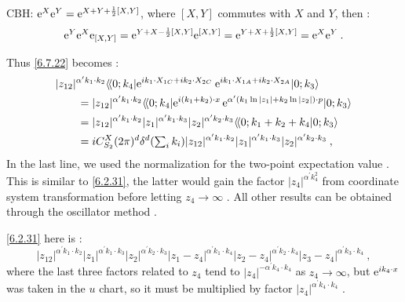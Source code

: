 \begin{tcolorbox}
	\begin{remark}
		CBH: $\mathrm{e}^X \mathrm{e}^Y=\mathrm{e}^{X+Y+\frac{1}{2}[X, Y]}$, where $[X, Y]$ commutes with $X$ and $Y$, then :
		\[
		\mathrm{e}^Y \mathrm{e}^X \mathrm{e}_{[X,Y]}= \mathrm{e}^{Y+X-\frac{1}{2}[X, Y]} \mathrm{e}^{[X,Y]} = \mathrm{e}^{Y+X+\frac{1}{2}[X, Y]} = \mathrm{e}^X \mathrm{e}^Y \:.
		\]
	\end{remark}
\end{tcolorbox}
\noindent Thus \eqref{6.7.22} becomes :
\begin{align}
	&|z_{12}|^{\alpha^{\prime} k_{1} \cdot k_{2}} \langle\!\langle 0 ; k_{4}|\mathrm{e}^{i k_{1} \cdot X_{1 C}+i k_{2} \cdot X_{2 C}} \: \mathrm{e}^{i k_{1} \cdot X_{1 A}+ i k_{2} \cdot X_{2 A}} | 0 ; k_{3}\rangle \nonumber \\
	&\qquad =|z_{12}|^{\alpha^{\prime} k_{1} \cdot k_{2}} \langle\!\langle 0 ; k_{4}|\mathrm{e}^{i(k_{1}+k_{2}) \cdot x} \, \mathrm{e}^{\alpha^{\prime}(k_{1} \ln |z_{1}|+k_{2} \ln |z_{2}|) \cdot p}| 0 ; k_{3}\rangle \nonumber \\
	&\qquad  = |z_{12}|^{\alpha^{\prime} k_{1} \cdot k_{2}} |z_{1}|^{\alpha^{\prime} k_{1} \cdot k_{3}} |z_{2}|^{\alpha^{\prime} k_{2} \cdot k_{3}} \langle\!\langle0 ; k_{1}+k_{2}+k_{4} |0 ; k_{3} \rangle \nonumber \\
	&\qquad =i C_{S_{2}}^{X}(2 \pi)^{d} \delta^{d}({\textstyle\sum_{i} k_{i}}) |z_{12}|^{\alpha^{\prime} k_{1} \cdot k_{2}} |z_{1}|^{\alpha^{\prime} k_{1} \cdot k_{3}} |z_{2}|^{\alpha^{\prime} k_{2} \cdot k_{3}} \:, \label{6.7.24}
\end{align}
In the last line, we used the normalization for the two-point expectation value . This is similar to \eqref{6.2.31}, the latter would gain the factor $|z_{4}|^{\alpha^{\prime} k_{4}^{2}}$ from coordinate system transformation before letting $z_{4} \rightarrow \infty$ . All other results can be obtained through the oscillator method .

\begin{tcolorbox}
	\begin{remark}
		\eqref{6.2.31} here is :
		\[
		|z_{12}|^{\alpha^{\prime} k_{1}\cdot k_{2}} |z_{1}|^{\alpha^{\prime} k_{1} \cdot k_{3}} 
		|z_{2}|^{\alpha^{\prime} k_{2} \cdot k_{3}}	|z_{1}-z_{4}|^{\alpha^{\prime} k_{1} \cdot k_{4}} 
		|z_{2}-z_{4}|^{\alpha^{\prime} k_{2} \cdot k_{4}} |z_{3}-z_{4}|^{\alpha^{\prime} k_{3} \cdot k_{4}} \:,
		\]
		where the last three factors related to $z_{4}$ tend to $|z_{4}|^{-\alpha^{\prime} k_{4} \cdot k_{4}}$ as $z_{4} \rightarrow \infty$, but $\mathrm{e}^{i k_{4}\cdot x}$ was taken in the $u$ chart, so it must be multiplied by factor $|z_{4}|^{\alpha^{\prime} k_{4} \cdot k_{4}}$ .
	\end{remark}
\end{tcolorbox}


